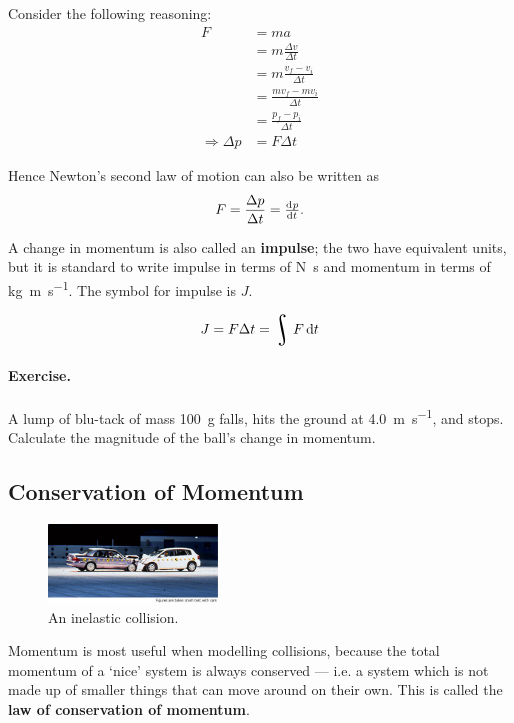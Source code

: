\documentclass[a4paper]{amsbook}
\DeclareMathOperator*{\rint}{\scalerel*{\rotatebox{17}{$\!\int\!$}}{\int}}
\newcommand\capcite[1]{}
\begin{document}
Consider the following reasoning:
\begin{align*}
  F &= ma\\
  &= m \frac{\Delta v}{\Delta t}\\
  &= m \frac{v_f - v_i}{\Delta t}\\
  &= \frac{mv_f - mv_i}{\Delta t}\\
  &= \frac{p_f - p_i}{\Delta t}\\
  \Rightarrow \Delta p &= F \Delta t
\end{align*}

Hence Newton's second law of motion can also be written as
\begin{equation}
  F = \frac{\Delta p}{\Delta t} = \od{p}{t}.
\end{equation}

A change in momentum is also called an \textbf{impulse}; the two have equivalent units, but it is standard to write impulse in
terms of \si{\newton\second} and momentum in terms of \si{\kilo\gram\meter\per\second}. The symbol for impulse is $ J $.

\begin{equation}
  J = F \Delta t = \rint F \dif{t}
\end{equation}

\paragraph{Exercise.} A lump of blu-tack of mass \SI{100}{\gram} falls, hits the ground at \SI{4.0}{\metre\per\second}, and stops. Calculate
the magnitude of the ball's change in momentum.

\subsection{Conservation of Momentum}
\begin{figure}
  \centering
  \includegraphics[width=0.4\textwidth]{carcrash}
  \caption{An inelastic collision. \capcite{http://world.honda.com/factbook/auto/motorshow/200110/img/12_p02.jpg}\label{fig:baddriver}}
\end{figure}
Momentum is most useful when modelling collisions, because the total momentum of a `nice' system is always conserved --- i.e. a system which is
not made up of smaller things that can move around on their own. This is called the \textbf{law of conservation of momentum}.
\end{document}
